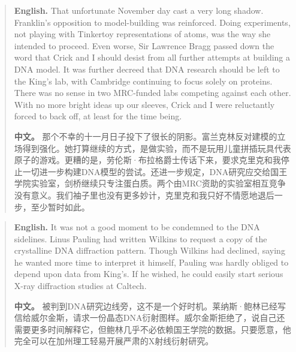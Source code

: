\begin{quote}
\noindent\textbf{English.} That unfortunate November day cast a very long shadow. Franklin's opposition to model-building was reinforced. Doing experiments, not playing with Tinkertoy representations of atoms, was the way she intended to proceed. Even worse, Sir Lawrence Bragg passed down the word that Crick and I should desist from all further attempts at building a DNA model. It was further decreed that DNA research should be left to the King's lab, with Cambridge continuing to focus solely on proteins. There was no sense in two MRC-funded labs competing against each other. With no more bright ideas up our sleeves, Crick and I were reluctantly forced to back off, at least for the time being.

\smallskip
\noindent\textbf{中文。} 那个不幸的十一月日子投下了很长的阴影。富兰克林反对建模的立场得到强化。她打算继续的方式，是做实验，而不是玩用儿童拼插玩具代表原子的游戏。更糟的是，劳伦斯·布拉格爵士传话下来，要求克里克和我停止一切进一步构建DNA模型的尝试。还进一步规定，DNA研究应交给国王学院实验室，剑桥继续只专注蛋白质。两个由MRC资助的实验室相互竞争没有意义。我们袖子里也没有更多妙计，克里克和我只好不情愿地退后一步，至少暂时如此。
\end{quote}

\begin{quote}
\noindent\textbf{English.} It was not a good moment to be condemned to the DNA sidelines. Linus Pauling had written Wilkins to request a copy of the crystalline DNA diffraction pattern. Though Wilkins had declined, saying he wanted more time to interpret it himself, Pauling was hardly obliged to depend upon data from King's. If he wished, he could easily start serious X-ray diffraction studies at Caltech.

\smallskip
\noindent\textbf{中文。} 被判到DNA研究边线旁，这不是一个好时机。莱纳斯·鲍林已经写信给威尔金斯，请求一份晶态DNA衍射图样。威尔金斯拒绝了，说自己还需要更多时间解释它，但鲍林几乎不必依赖国王学院的数据。只要愿意，他完全可以在加州理工轻易开展严肃的X射线衍射研究。
\end{quote}

